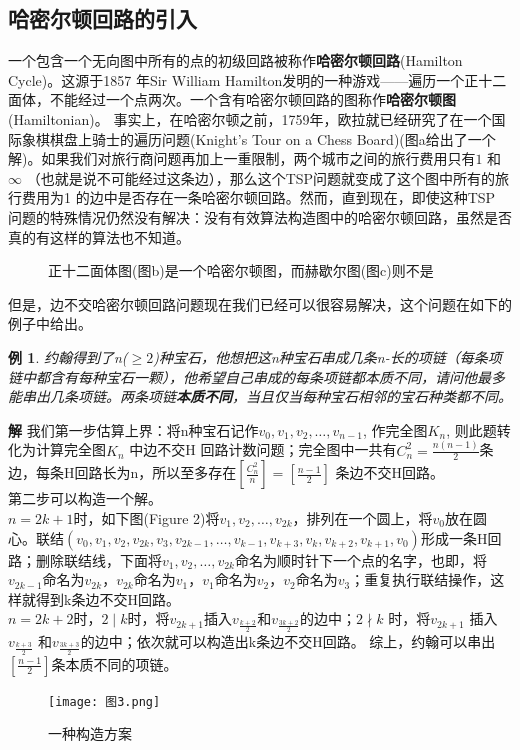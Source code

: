\documentclass[11pt,a4paper,openany]{book}
\newtheorem{sample}{\textbf{例}}[section]
\begin{document}
\subsection{哈密尔顿回路的引入} 一个包含一个无向图中所有的点的初级回路被称作\textbf{哈密尔顿回路}(Hamilton Cycle)。这源于1857 年Sir William Hamilton发明的一种游戏——遍历一个正十二面体，不能经过一个点两次。一个含有哈密尔顿回路的图称作\textbf{哈密尔顿图}(Hamiltonian)。 事实上，在哈密尔顿之前，1759年，欧拉就已经研究了在一个国际象棋棋盘上骑士的遍历问题(Knight's Tour on a Chess Board)(图a给出了一个解)。如果我们对旅行商问题再加上一重限制，两个城市之间的旅行费用只有$1$ 和$\infty$ （也就是说不可能经过这条边），那么这个TSP问题就变成了这个图中所有的旅行费用为1 的边中是否存在一条哈密尔顿回路。然而，直到现在，即使这种TSP 问题的特殊情况仍然没有解决：没有有效算法构造图中的哈密尔顿回路，虽然是否真的有这样的算法也不知道。\\
\begin{figure}[H]
\centering
{}
\caption{正十二面体图(图b)是一个哈密尔顿图，而赫歇尔图(图c)则不是}
\label{Fig.lable}
\end{figure}
但是，边不交哈密尔顿回路问题现在我们已经可以很容易解决，这个问题在如下的例子中给出。\\
\begin{sample} {\K 约翰得到了n($\geq 2$)种宝石，他想把这n种宝石串成几条n-长的项链（每条项链中都含有每种宝石一颗），他希望自己串成的每条项链都本质不同，请问他最多能串出几条项链。两条项链\textbf{本质不同}，当且仅当每种宝石相邻的宝石种类都不同。}\end{sample}
\textbf{解} 我们第一步估算上界：将n种宝石记作$v_0,v_1,v_2,\dots,v_{n-1}$, 作完全图$K_n$, 则此题转化为计算完全图$K_n$ 中边不交H 回路计数问题；完全图中一共有$C_{n}^{2}=\frac{n(n-1)}{2}$条边，每条H回路长为n，所以至多存在$[\frac{C_n^2}{n}]=[\frac{n-1}{2}]$ 条边不交H回路。
\\第二步可以构造一个解。\\
$n=2k+1$时，如下图(Figure 2)将$v_1,v_2,\dots,v_{2k}$，排列在一个圆上，将$v_0$放在圆心。联结$(v_0,v_1,v_2,v_{2k},v_3,v_{2k-1},\dots,v_{k-1},v_{k+3},v_{k},v_{k+2},v_{k+1},v_0)$形成一条H回路；删除联结线，下面将$v_1,v_2,\dots,v_{2k}$命名为顺时针下一个点的名字，也即，将$v_{2k-1}$命名为$v_{2k}$，$v_{2k}$命名为$v_1$，$v_1$命名为$v_2$，$v_2$命名为$v_3$；重复执行联结操作，这样就得到k条边不交H回路。\\
$n=2k+2$时，$2\mid k$时，将$v_{2k+1}$插入$v_{\frac{k+2}{2}}$和$v_{\frac{3k+2}{2}}$的边中；$2 \nmid k$ 时，将$v_{2k+1}$ 插入$v_{\frac{k+3}{2}}$ 和$v_{\frac{3k+3}{2}}$的边中；依次就可以构造出k条边不交H回路。
综上，约翰可以串出$[\frac{n-1}{2}]$条本质不同的项链。
\begin{figure}[h]
 \centering
  \texttt{[image: 图3.png]}
  \caption{一种构造方案}\label{Fig.label}
\end{figure}
\end{document}
